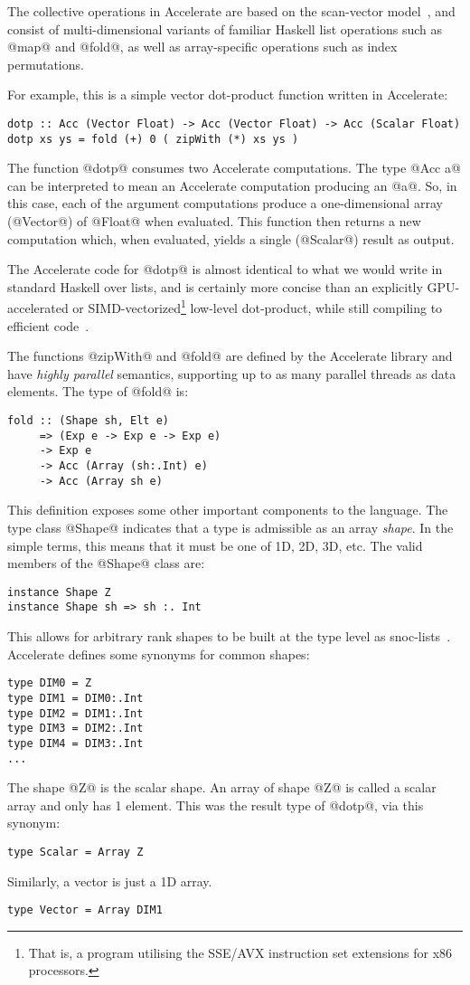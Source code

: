 The collective operations in Accelerate are based on the scan-vector model~\citep{Chatterjee:1990vj,Sengupta:2007tc}, and consist of multi-dimensional variants of familiar Haskell list operations such as @map@ and @fold@, as well as array-specific operations such as index permutations.

For example, this is a simple vector dot-product function written in Accelerate:
%
\begin{lstlisting}
dotp :: Acc (Vector Float) -> Acc (Vector Float) -> Acc (Scalar Float)
dotp xs ys = fold (+) 0 ( zipWith (*) xs ys )
\end{lstlisting}
%
The function @dotp@ consumes two Accelerate computations. The type @Acc a@ can be interpreted to mean an Accelerate computation producing an @a@. So, in this case, each of the argument computations produce a one-dimensional array (@Vector@) of @Float@ when evaluated. This function then returns a new computation which, when evaluated, yields a single (@Scalar@) result as output.

The Accelerate code for @dotp@ is almost identical to what we would write in standard Haskell over lists, and is certainly more concise than an explicitly GPU-accelerated or SIMD-vectorized\footnote{That is, a program utilising the SSE/AVX instruction set extensions for x86 processors.} low-level dot-product, while still compiling to efficient code~\citep{Chakravarty:acc-cuda,McDonell:acc-optim,McDonell:2015:acc-llvm}.

The functions @zipWith@ and @fold@ are defined by the Accelerate library and have \emph{highly parallel} semantics, supporting up to as many parallel threads as data elements. The type of @fold@ is:
%
\begin{lstlisting}
fold :: (Shape sh, Elt e)
     => (Exp e -> Exp e -> Exp e)
     -> Exp e
     -> Acc (Array (sh:.Int) e)
     -> Acc (Array sh e)
\end{lstlisting}
%
This definition exposes some other important components to the language. The type class @Shape@ indicates that a type is admissible as an array \emph{shape}. In the simple terms, this means that it must be one of 1D, 2D, 3D, etc. The valid members of the @Shape@ class are:
%
\begin{lstlisting}
instance Shape Z
instance Shape sh => sh :. Int
\end{lstlisting}
%
This allows for arbitrary rank shapes to be built at the type level as snoc-lists~\citep{Keller:Repa,Chakravarty:acc-cuda}. Accelerate defines some synonyms for common shapes:
%
\begin{lstlisting}
type DIM0 = Z
type DIM1 = DIM0:.Int
type DIM2 = DIM1:.Int
type DIM3 = DIM2:.Int
type DIM4 = DIM3:.Int
...
\end{lstlisting}
%
The shape @Z@ is the scalar shape. An array of shape @Z@ is called a scalar array and only has 1 element. This was the result type of @dotp@, via this synonym:
%
\begin{lstlisting}
type Scalar = Array Z
\end{lstlisting}
%
Similarly, a vector is just a 1D array.
%
\begin{lstlisting}
type Vector = Array DIM1
\end{lstlisting}
%

